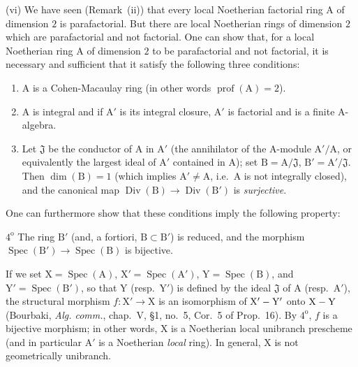 \begin{env}[21.13.9]
(vi) We have seen (Remark~(ii)) that every local Noetherian factorial ring $\mathrm{A}$ of dimension $2$ is parafactorial.
But there are local Noetherian rings of dimension $2$ which are parafactorial and not factorial.
One can show that, for a local Noetherian ring $\mathrm{A}$ of dimension $2$ to be parafactorial and not factorial, it is necessary and sufficient that it satisfy the following three conditions:
\begin{enumerate}[label=\arabic*\textsuperscript{o}]
  \item $\mathrm{A}$ is a Cohen-Macaulay ring (in other words $\operatorname{prof}(\mathrm{A})=2$).
  \item $\mathrm{A}$ is integral and if $\mathrm{A}'$ is its integral closure, $\mathrm{A}'$ is factorial and is a finite A-algebra.
  \item Let $\mathfrak{J}$ be the conductor of $\mathrm{A}$ in $\mathrm{A}'$ (the annihilator of the $\mathrm{A}$-module $\mathrm{A}'/\mathrm{A}$, or equivalently the largest ideal of $\mathrm{A}'$ contained in $\mathrm{A}$); set $\mathrm{B}=\mathrm{A}/\mathfrak{J}$, $\mathrm{B}'=\mathrm{A}'/\mathfrak{J}$. Then $\dim(\mathrm{B})=1$ (which implies $\mathrm{A}'\neq\mathrm{A}$, i.e.\ $\mathrm{A}$ is not integrally closed), and the canonical map $\operatorname{Div}(\mathrm{B})\to\operatorname{Div}(\mathrm{B}')$  is \emph{surjective}.
\end{enumerate}
One can furthermore show that these conditions imply the following property:

$4^{\mathrm{o}}$ The ring $\mathrm{B}'$ (and, a fortiori, $\mathrm{B}\subset\mathrm{B}'$) is reduced, and the morphism $\operatorname{Spec}(\mathrm{B}')\to\operatorname{Spec}(\mathrm{B})$ is bijective.

If we set $\mathrm{X}=\operatorname{Spec}(\mathrm{A})$, $\mathrm{X}'=\operatorname{Spec}(\mathrm{A}')$, $\mathrm{Y}=\operatorname{Spec}(\mathrm{B})$, and $\mathrm{Y}'=\operatorname{Spec}(\mathrm{B}')$, so that $\mathrm{Y}$ (resp.\ $\mathrm{Y}'$) is defined by the ideal $\mathfrak{J}$ of $\mathrm{A}$ (resp.\ $\mathrm{A}'$), the structural morphism $f:\mathrm{X}'\to\mathrm{X}$ is an isomorphism of $\mathrm{X}'-\mathrm{Y}'$ onto $\mathrm{X}-\mathrm{Y}$ (Bourbaki, \emph{Alg. comm.}, chap.~V, \S1, no.~5, Cor.~5 of Prop.~16). By $4^{\mathrm{o}}$, $f$ is a bijective morphism; in other words, $\mathrm{X}$ is a Noetherian local unibranch prescheme  (and in particular $\mathrm{A}'$ is a Noetherian \emph{local} ring). In general, $\mathrm{X}$ is not geometrically unibranch.


\end{env}
